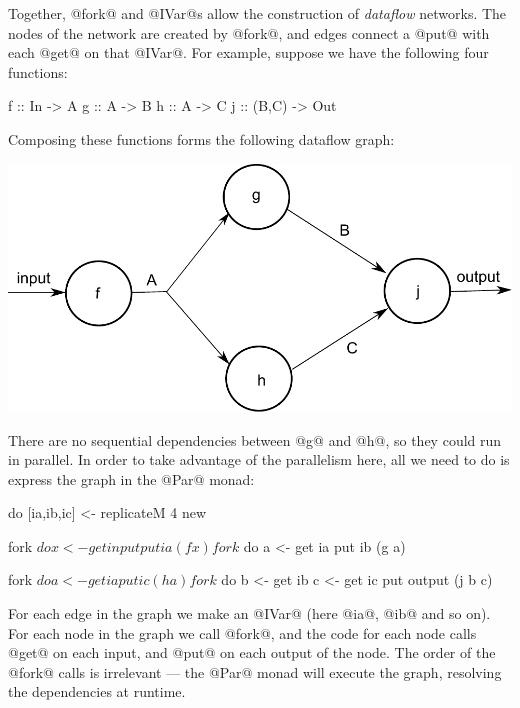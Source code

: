 Together, @fork@ and @IVar@s allow the construction of
\emph{dataflow} networks.  The nodes of the network are created by
@fork@, and edges connect a @put@ with each @get@ on that @IVar@.  For
example, suppose we have the following four functions:

\begin{haskell}
f :: In -> A
g :: A -> B
h :: A -> C
j :: (B,C) -> Out
\end{haskell}

\noindent Composing these functions forms the following dataflow graph:

\begin{center}
\includegraphics[scale=0.6]{dataflow.pdf}
\end{center}

There are no sequential dependencies between @g@ and @h@, so they
could run in parallel.  In order to take advantage of the parallelism
here, all we need to do is express the graph in the @Par@ monad:

\begin{haskell}
do
   [ia,ib,ic] <- replicateM 4 new

   fork $ do x <- get input
             put ia (f x)

   fork $ do a <- get ia
             put ib (g a)

   fork $ do a <- get ia
             put ic (h a)

   fork $ do b <- get ib
             c <- get ic
             put output (j b c)
\end{haskell}

\noindent For each edge in the graph we make an @IVar@ (here @ia@,
@ib@ and so on).  For each node in the graph we call @fork@, and the
code for each node calls @get@ on each input, and @put@ on each output
of the node.  The order of the @fork@ calls is irrelevant --- the
@Par@ monad will execute the graph, resolving the dependencies at
runtime.

